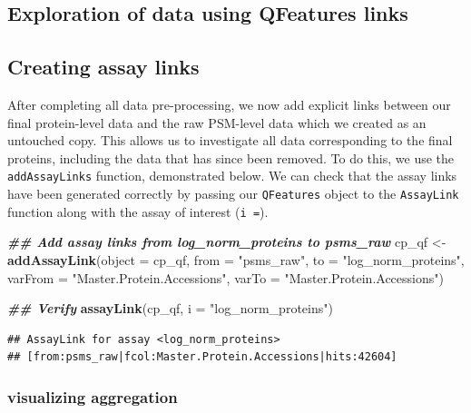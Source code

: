\documentclass[9pt,a4paper,]{extarticle}
\newenvironment{Shaded}{\begin{snugshade}}{\end{snugshade}}
\newcommand{\AttributeTok}[1]{\textcolor[rgb]{0.13,0.29,0.53}{#1}}
\newcommand{\DocumentationTok}[1]{\textcolor[rgb]{0.56,0.35,0.01}{\textbf{\textit{#1}}}}
\newcommand{\FunctionTok}[1]{\textcolor[rgb]{0.13,0.29,0.53}{\textbf{#1}}}
\newcommand{\NormalTok}[1]{#1}
\newcommand{\OtherTok}[1]{\textcolor[rgb]{0.56,0.35,0.01}{#1}}
\newcommand{\StringTok}[1]{\textcolor[rgb]{0.31,0.60,0.02}{#1}}
\begin{document}
\subsection{Exploration of data using QFeatures links}\label{exploration-of-data-using-qfeatures-links}

\subsection{Creating assay links}\label{creating-assay-links}

After completing all data pre-processing, we now add explicit links between our
final protein-level data and the raw PSM-level data which we created as an
untouched copy. This allows us to investigate all data corresponding to the
final proteins, including the data that has since been removed. To do this, we
use the \texttt{addAssayLinks} function, demonstrated below. We can check that the
assay links have been generated correctly by passing our \texttt{QFeatures} object to
the \texttt{AssayLink} function along with the assay of interest (\texttt{i\ =}).

\begin{Shaded}
\begin{Highlighting}[]
\DocumentationTok{\#\# Add assay links from log\_norm\_proteins to psms\_raw}
\NormalTok{cp\_qf }\OtherTok{\textless{}{-}} \FunctionTok{addAssayLink}\NormalTok{(}\AttributeTok{object =}\NormalTok{ cp\_qf, }
                      \AttributeTok{from =} \StringTok{"psms\_raw"}\NormalTok{,}
                      \AttributeTok{to =} \StringTok{"log\_norm\_proteins"}\NormalTok{,}
                      \AttributeTok{varFrom =} \StringTok{"Master.Protein.Accessions"}\NormalTok{,}
                      \AttributeTok{varTo =} \StringTok{"Master.Protein.Accessions"}\NormalTok{)}

\DocumentationTok{\#\# Verify}
\FunctionTok{assayLink}\NormalTok{(cp\_qf, }
          \AttributeTok{i =} \StringTok{"log\_norm\_proteins"}\NormalTok{)}
\end{Highlighting}
\end{Shaded}

\begin{verbatim}
## AssayLink for assay <log_norm_proteins>
## [from:psms_raw|fcol:Master.Protein.Accessions|hits:42604]
\end{verbatim}

\subsubsection{visualizing aggregation}\label{visualizing-aggregation}
\end{document}
